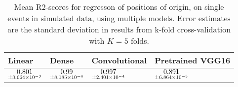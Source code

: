 \begin{table}
\centering
\caption{
Mean R2-scores for regresson of positions of origin, on single events in simulated data, using multiple models. 
Error estimates are the standard deviation in results from k-fold cross-validation 
with $K=5$ folds.
}
\label{tab:regression-simulated-single-position-r2}
\begin{tabular}{llll}
\toprule
                                             Linear &                                              Dense &                                       Convolutional &                                    Pretrained VGG16 \\
\midrule
 $\underset{\num{+- 3.664e-03 }  }{\num{ 0.801 } }$ &  $\underset{\num{+- 8.185e-04 }  }{\num{ 0.99 } }$ &  $\underset{\num{+- 2.401e-04 }  }{\num{ 0.997 } }$ &  $\underset{\num{+- 6.864e-03 }  }{\num{ 0.891 } }$ \\
\bottomrule
\end{tabular}
\end{table}
